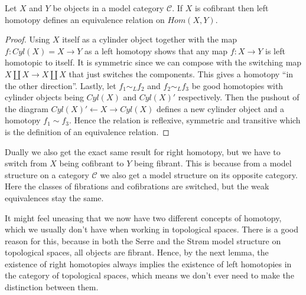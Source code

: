 \begin{lemma}
Let $X$ and $Y$ be objects in a model category $\mathcal{C}$. If $X$ is cofibrant then left homotopy defines an equivalence relation on $Hom(X,Y)$.
\end{lemma}
\begin{proof}
Using $X$ itself as a cylinder object together with the map $f:Cyl(X)=X\rightarrow Y$ as a left homotopy shows that any map $f:X\rightarrow Y$ is left homotopic to itself. It is symmetric since we can compose with the switching map $X\coprod X \rightarrow X\coprod X$ that just switches the components. This gives a homotopy “in the other direction”. Lastly, let $f_1\sim_L f_2$ and $f_2\sim_L f_3$ be good homotopies with cylinder objects being $Cyl(X)$ and $Cyl(X)'$ respectively. Then the pushout of the diagram $Cyl(X)' \leftarrow X \rightarrow Cyl(X)$ defines a new cylinder object and a homotopy $f_1\sim f_3$. Hence the relation is reflexive, symmetric and transitive which is the definition of an equivalence relation.
\end{proof}

Dually we also get the exact same result for right homotopy, but we have to switch from $X$ being cofibrant to $Y$ being fibrant. This is because from a model structure on a category $\mathcal{C}$ we also get a model structure on its opposite category. Here the classes of fibrations and cofibrations are switched, but the weak equivalences stay the same. 

It might feel uneasing that we now have two different concepts of homotopy, which we usually don't have when working in topological spaces. There is a good reason for this, because in both the Serre and the Strøm model structure on topological spaces, all objects are fibrant. Hence, by the next lemma, the existence of right homotopies always implies the existence of left homotopies in the category of topological spaces, which means we don’t ever need to make the distinction between them.


